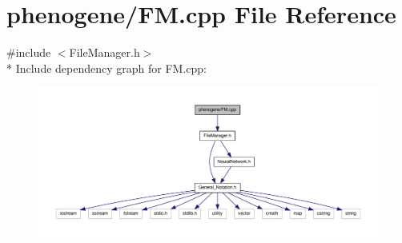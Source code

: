 \hypertarget{a00005}{\section{phenogene/\-F\-M.cpp File Reference}
\label{dd/dad/a00005}
}
{\ttfamily \#include $<$File\-Manager.\-h$>$}\\*
Include dependency graph for F\-M.\-cpp\-:\nopagebreak
\begin{figure}[H]
\begin{center}
\leavevmode
\includegraphics[width=350pt]{dc/de2/a00024}
\end{center}
\end{figure}
